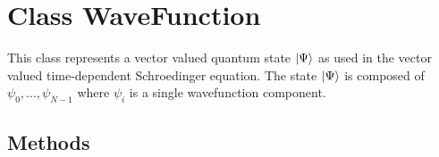 
\section{Class WaveFunction}

    \label{WaveFunction:WaveFunction}
This class represents a vector valued quantum state
$\Ket{\Psi}$ as used in the vector valued
time-dependent Schroedinger equation. The state
$\Ket{\Psi}$ is composed of
$\psi_0, \ldots,
\psi_{N-1}$ where $\psi_i$ is a single
wavefunction component.



  \subsection{Methods}

    \label{WaveFunction:WaveFunction:__init__}

    \vspace{0.5ex}


